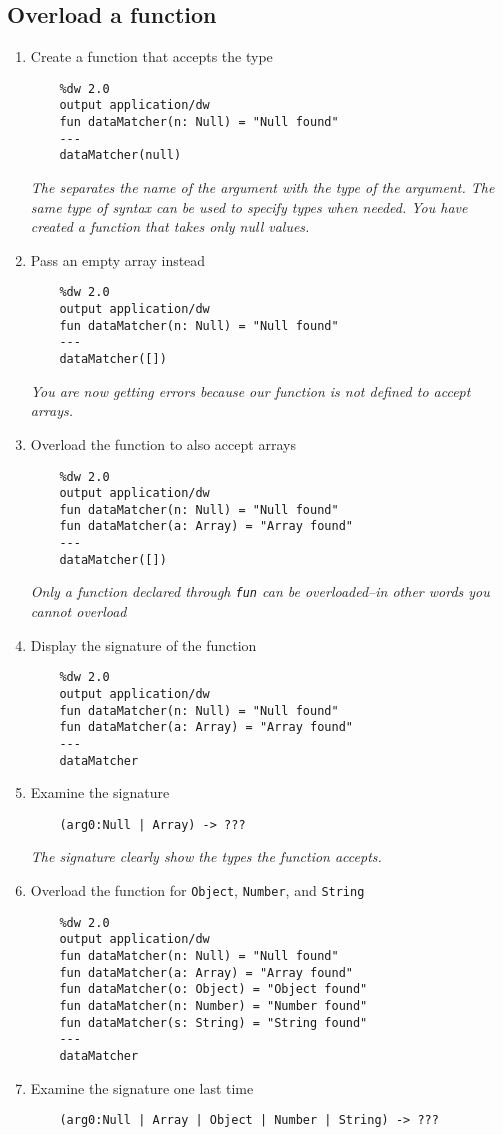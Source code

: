 \subsection{Overload a function}
\begin{enumerate}[resume*]
\item Create a function that accepts the  type
  \begin{lstlisting}
    %dw 2.0
    output application/dw
    fun dataMatcher(n: Null) = "Null found"
    ---
    dataMatcher(null)
  \end{lstlisting}
  \emph{
    The \ttt{:} separates the name of the argument with the type of the argument.  The same type of syntax can be used to specify types when needed.
    \newline
    You have created a function that takes only null values.
  }
\item Pass an empty array instead
  \begin{lstlisting}
    %dw 2.0
    output application/dw
    fun dataMatcher(n: Null) = "Null found"
    ---
    dataMatcher([])
  \end{lstlisting}
  \emph{
    You are now getting errors because our function is not defined to accept arrays.
  }
\item Overload the function to also accept arrays
  \begin{lstlisting}
    %dw 2.0
    output application/dw
    fun dataMatcher(n: Null) = "Null found"
    fun dataMatcher(a: Array) = "Array found"
    ---
    dataMatcher([])
  \end{lstlisting}
  \emph{
    Only a function declared through \lstinline{fun} can be overloaded--in other words you cannot overload \lep
  }
\item Display the signature of the  function
  \begin{lstlisting}
    %dw 2.0
    output application/dw
    fun dataMatcher(n: Null) = "Null found"
    fun dataMatcher(a: Array) = "Array found"
    ---
    dataMatcher
  \end{lstlisting}
\item Examine the signature
  \begin{lstlisting}
    (arg0:Null | Array) -> ???
  \end{lstlisting}
  \emph{
    The signature clearly show the types the function accepts.
  }
\item Overload the function for \lstinline{Object}, \lstinline{Number}, and \lstinline{String}
  \begin{lstlisting}
    %dw 2.0
    output application/dw
    fun dataMatcher(n: Null) = "Null found"
    fun dataMatcher(a: Array) = "Array found"
    fun dataMatcher(o: Object) = "Object found"
    fun dataMatcher(n: Number) = "Number found"
    fun dataMatcher(s: String) = "String found"
    ---
    dataMatcher
  \end{lstlisting}
\item Examine the signature one last time
  \begin{lstlisting}
    (arg0:Null | Array | Object | Number | String) -> ???
  \end{lstlisting}
\end{enumerate}

